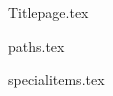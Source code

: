\documentclass[a4paper,10pt]{article}
\begin{document}
{Titlepage.tex}

{paths.tex}

{specialitems.tex}

\end{document}
